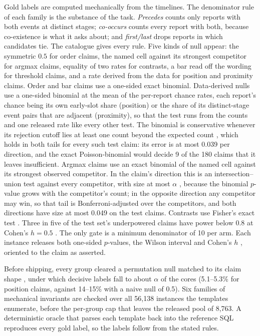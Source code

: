 \label{sec:gold}
Gold labels are computed mechanically from the timelines. The denominator
rule of each family is the substance of the task. \emph{Precedes} counts
only reports with both events at distinct stages; \emph{co-occurs} counts
every report with both, because co-existence is what it asks about; and
\emph{first/last} drops reports in which candidates tie. The catalogue gives
every rule. Five kinds of null appear: the symmetric $0.5$ for order claims,
the named cell against its strongest competitor for argmax claims, equality
of two rates for contrasts, a bar read off the wording for threshold claims,
and a rate derived from the data for position and proximity claims. Order
and bar claims use a one-sided exact binomial. Data-derived nulls use a
one-sided binomial at the mean of the per-report chance rates, each
report's chance being its own early-slot share (position) or the share of its distinct-stage event pairs that are adjacent (proximity),
so that the test runs from the counts and one released rate like every
other test. The binomial is
conservative whenever its rejection cutoff lies at least one count beyond the
expected count \cite{hoeffding1956}, which holds in both tails for every
such test claim: its error is at most 0.039 per direction, and the exact
Poisson-binomial would decide 9 of the 180 claims that it leaves
insufficient. Argmax claims use an exact binomial of the named cell against its
strongest observed competitor. In the claim's direction this is an
intersection--union test against every competitor, with size at most
$\alpha$ \cite{berger1982}, because the binomial $p$-value grows with the
competitor's count; in the opposite direction any competitor may win, so
that tail is Bonferroni-adjusted over the competitors, and both directions
have size at most 0.049 on the test claims. Contrasts use Fisher's exact test \cite{fisher1935design}. Three in five
of the test set's underpowered claims have power below 0.8 at Cohen's
$h = 0.5$ \cite{cohen1988}. The only gate is a minimum denominator of 10 per
arm. Each instance releases both one-sided $p$-values, the Wilson interval
\cite{wilson1927} and Cohen's $h$ \cite{cohen1988}, oriented to the claim as
asserted.

\label{sec:screens}
Before shipping, every group cleared a permutation null matched to its claim
shape \cite{good2005permutation}, under which decisive labels fall to about
$\alpha$ of the cores (5.1--5.3\% for position claims, against 14--15\% with a
naive null of 0.5). Six families of mechanical invariants are
checked over all 56{,}138 instances the templates enumerate, before the
per-group cap that leaves the released pool of 8{,}763. A
deterministic oracle that parses each template back into the reference SQL
reproduces every gold label, so the labels follow from the stated rules.

